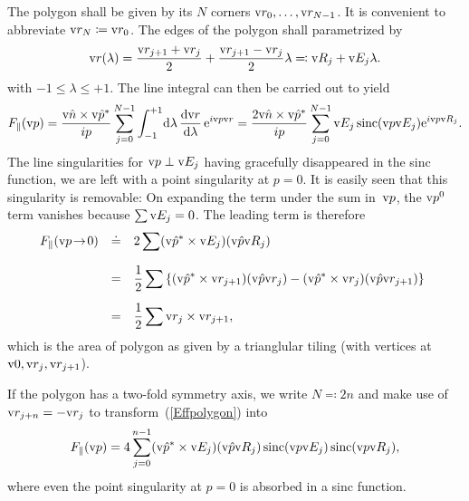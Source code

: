 The polygon shall be given by its $N$ corners $\text{v}{r}_0,\ldots,\text{v}{r}_{N-1}$.
It is convenient to abbreviate $\text{v}{r}_N\coloneqq\text{v}{r}_0$.
The edges of the polygon shall parametrized by
\begin{equation}
  \text{v}{r}(\lambda) = \frac{\text{v}{r}_{j+1}+\text{v}{r}_j}{2} + \frac{\text{v}{r}_{j+1}-\text{v}{r}_j}{2} \lambda
  \eqqcolon \text{v}{R}_j + \text{v}{E}_j\lambda.
\end{equation}
with $-1\le\lambda\le+1$.
The line integral can then be carried out to yield
\begin{equation}\label{Effpolygon}
    F_\parallel(\text{v}{p}) = \displaystyle \frac{\text{v}{\hat n}\times\text{v}{\hat p}^*}{ip} \sum_{j=0}^{N-1}
              \int_{-1}^{+1}\!\text{d}\lambda\, \frac{\text{d}\text{v}{r}}{\text{d}\lambda}\,\text{e}^{i\text{v}{p}\text{v}{r}}
          = \displaystyle \frac{2\text{v}{\hat n}\times\text{v}{\hat p}^*}{ip} \sum_{j=0}^{N-1}
              \text{v}{E}_j \operatorname{sinc}(\text{v}{p}\text{v}{E}_j) \text{e}^{i\text{v}{p}\text{v}{R}_j}.
\end{equation}
The line singularities for $\text{v}{p}\perp\text{v}{E}_j$ having gracefully disappeared in the
sinc function,
we are left with a point singularity at $p=0$.
It is easily seen that this singularity is removable:
On expanding the term under the sum in~$\text{v}{p}$,
the $\text{v}{p}^0$ term vanishes because $\sum\text{v}{E}_j=0$.
The leading term is therefore
\begin{equation}
  \begin{array}{@{}lcl}
  F_\parallel(\qp\!\to\!0) &\doteq& \displaystyle 2\sum (\uqp^*\times\E_j) (\uqp\R_j)\\[3ex]
    &=&\displaystyle \frac{1}{2}\sum \left\{
        (\uqp^*\times\r_{j+1})(\uqp\r_j) -
        (\uqp^*\times\r_j)(\uqp\r_{j+1})
      \right\}\\[3ex]
    &=&\displaystyle \frac{1}{2}\sum \r_j\times\r_{j+1},
  \end{array}
\end{equation}
which is the area of polygon
as given by a trianglular tiling (with vertices at $\text{v}{0},\text{v}{r}_j,\text{v}{r}_{j+1}$).

If the polygon has a two-fold symmetry axis, we write $N\eqqcolon2n$
and make use of $\text{v}{r}_{j+n}=-\text{v}{r}_j$ to transform~(\ref{Effpolygon}) into
\begin{equation}\label{Eff2ngon}
    F_\parallel(\text{v}{p}) = \displaystyle 4 \sum_{j=0}^{n-1}
              (\text{v}{\hat p}^*\times\text{v}{E}_j) (\text{v}{\hat p}\text{v}{R}_j) \operatorname{sinc}(\text{v}{p}\text{v}{E}_j) \operatorname{sinc}(\text{v}{p}\text{v}{R}_j),
\end{equation}
where even the point singularity at $p=0$ is absorbed in a sinc function.
%
%


